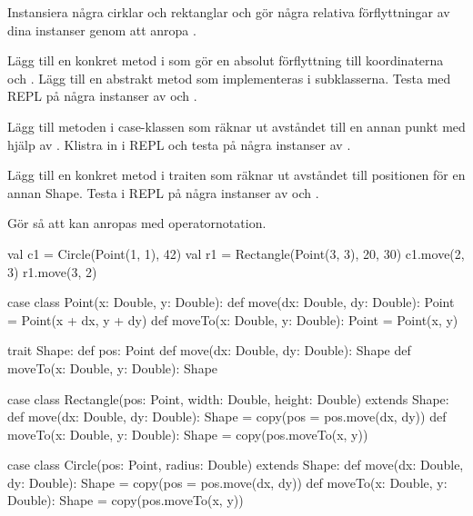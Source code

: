 \Subtask Instansiera några cirklar och rektanglar och gör några relativa förflyttningar av dina instanser genom att anropa .

\Subtask Lägg till en konkret metod  i  som gör en absolut förflyttning till koordinaterna  och . Lägg till en abstrakt metod   som implementeras i subklasserna. Testa med REPL på några instanser av  och .

\Subtask Lägg till metoden  i case-klassen  som räknar ut avståndet till en annan punkt med hjälp av . Klistra in i REPL och testa på några instanser av .

\Subtask Lägg till en konkret metod  i traiten  som räknar ut avståndet till positionen för en annan Shape. Testa i REPL på några instanser av  och .

\Subtask Gör så att  kan anropas med operatornotation.

\SOLUTION


\TaskSolved \what


\SubtaskSolved
\begin{CodeSmall}
val c1 = Circle(Point(1, 1), 42)
val r1 = Rectangle(Point(3, 3), 20, 30)
c1.move(2, 3)
r1.move(3, 2)
\end{CodeSmall}

\SubtaskSolved  
\begin{CodeSmall}
case class Point(x: Double, y: Double):
  def move(dx: Double, dy: Double): Point = Point(x + dx, y + dy)
  def moveTo(x: Double, y: Double): Point = Point(x, y)

trait Shape:
  def pos: Point
  def move(dx: Double, dy: Double): Shape
  def moveTo(x: Double, y: Double): Shape

case class Rectangle(pos: Point, width: Double, height: Double) extends Shape:
  def move(dx: Double, dy: Double): Shape = copy(pos = pos.move(dx, dy))
  def moveTo(x: Double, y: Double): Shape = copy(pos.moveTo(x, y))

case class Circle(pos: Point, radius: Double) extends Shape:
  def move(dx: Double, dy: Double): Shape = copy(pos = pos.move(dx, dy))
  def moveTo(x: Double, y: Double): Shape = copy(pos.moveTo(x, y))
\end{CodeSmall}


\SubtaskSolved {}

